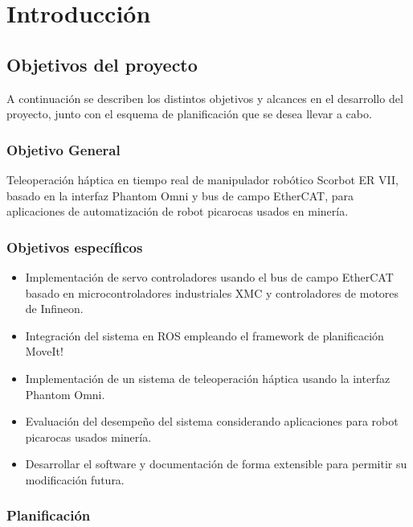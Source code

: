 \chapter{Introducción}

\section{Objetivos del proyecto}

A continuación se describen los distintos objetivos y alcances en el desarrollo del proyecto, junto con el esquema de planificación que se desea llevar a cabo.

\subsection{Objetivo General}

Teleoperación háptica en tiempo real de manipulador robótico Scorbot ER VII, basado en la interfaz Phantom Omni y bus de campo EtherCAT, para aplicaciones de automatización de robot picarocas usados en minería.

\subsection{Objetivos específicos}

\begin{itemize}

\item Implementación de servo controladores usando el bus de campo EtherCAT basado en microcontroladores industriales XMC y controladores de motores de Infineon.

\item Integración del sistema en ROS empleando el framework de planificación MoveIt!

\item Implementación de un sistema de teleoperación háptica usando la interfaz Phantom Omni.

\item Evaluación del desempeño del sistema considerando aplicaciones para robot picarocas usados minería.

\item Desarrollar el software y documentación de forma extensible para permitir su modificación futura.

\end{itemize}

\subsection{Planificación}

